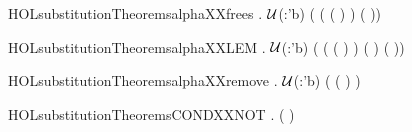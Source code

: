 \begin{SaveVerbatim}{HOLsubstitutionTheoremsalphaXXfrees}
\HOLTokenTurnstile{} \HOLSymConst{\HOLTokenForall{}}  .
      \ensuremath{\cal{U}}(:'b) \HOLSymConst{\HOLTokenImp{}}
      \HOLConst{\HOLTokenNotIn{}}   \HOLSymConst{\HOLTokenImp{}}
     ( ( ( )  ) \HOLSymConst{=}    ( ))
\end{SaveVerbatim}
\newcommand{\HOLsubstitutionTheoremsalphaXXfrees}{\UseVerbatim{HOLsubstitutionTheoremsalphaXXfrees}}
\begin{SaveVerbatim}{HOLsubstitutionTheoremsalphaXXLEM}
\HOLTokenTurnstile{} \HOLSymConst{\HOLTokenForall{}}     .
      \ensuremath{\cal{U}}(:'b) \HOLSymConst{\HOLTokenImp{}}
      \HOLConst{\HOLTokenNotIn{}}   \HOLSymConst{\HOLTokenImp{}}
     (  ( ( )  )
        (   ) \HOLSymConst{=}
         (   ))
\end{SaveVerbatim}
\newcommand{\HOLsubstitutionTheoremsalphaXXLEM}{\UseVerbatim{HOLsubstitutionTheoremsalphaXXLEM}}
\begin{SaveVerbatim}{HOLsubstitutionTheoremsalphaXXremove}
\HOLTokenTurnstile{} \HOLSymConst{\HOLTokenForall{}}  .
      \ensuremath{\cal{U}}(:'b) \HOLSymConst{\HOLTokenImp{}}
      \HOLConst{\HOLTokenNotIn{}}   \HOLSymConst{\HOLTokenConj{}}  \HOLSymConst{\HOLTokenNotEqual{}}  \HOLSymConst{\HOLTokenImp{}}
      \HOLConst{\HOLTokenNotIn{}}  ( ( )  )
\end{SaveVerbatim}
\newcommand{\HOLsubstitutionTheoremsalphaXXremove}{\UseVerbatim{HOLsubstitutionTheoremsalphaXXremove}}
\begin{SaveVerbatim}{HOLsubstitutionTheoremsCONDXXNOT}
\HOLTokenTurnstile{} \HOLSymConst{\HOLTokenForall{}}  . ( \HOLSymConst{\HOLTokenNeg{}}    ) \HOLSymConst{=}      
\end{SaveVerbatim}
